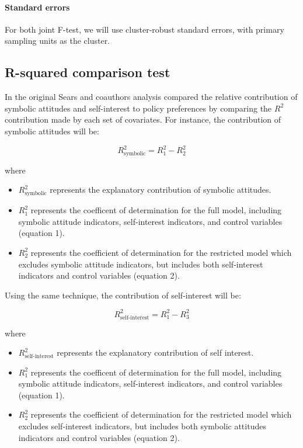 \documentclass[]{article}
\let\oldparagraph\paragraph
\renewcommand{\paragraph}[1]{\oldparagraph{#1}\mbox{}}
\begin{document}
\paragraph{Standard errors}\label{standard-errors}

For both joint F-test, we will use cluster-robust standard errors, with
primary sampling units as the cluster.

\subsection{R-squared comparison test}\label{r-squared-comparison-test}

In the original Sears and coauthors analysis compared the relative
contribution of symbolic attitudes and self-interest to policy
preferences by comparing the \(R^2\) contribution made by each set of
covariates. For instance, the contribution of symbolic attitudes will
be:

\[R^2_{\text{symbolic}} = R^2_1 - R^2_2\]

where

\begin{itemize}
  \item $R^2_{\text{symbolic}}$ represents the explanatory contribution of symbolic attitudes.
  \item $R^2_1$ represents the coefficent of determination for the full model, including symbolic attitude indicators, self-interest indicators, and control variables (equation 1).
  \item $R^2_2$ represents the coefficient of determination for the restricted model which excludes symbolic attitude indicators, but includes both self-interest indicators and control variables (equation 2).
\end{itemize}

Using the same technique, the contribution of self-interest will be:

\[R^2_{\text{self-interest}} = R^2_1 - R^2_3\]

where

\begin{itemize}
  \item $R^2_{\text{self-interest}}$ represents the explanatory contribution of self interest.
  \item $R^2_1$ represents the coefficent of determination for the full model, including symbolic attitude indicators, self-interest indicators, and control variables (equation 1).
  \item $R^2_2$ represents the coefficient of determination for the restricted model which excludes self-interest indicators, but includes both symbolic attitudes indicators and control variables (equation 2).
\end{itemize}
\end{document}
